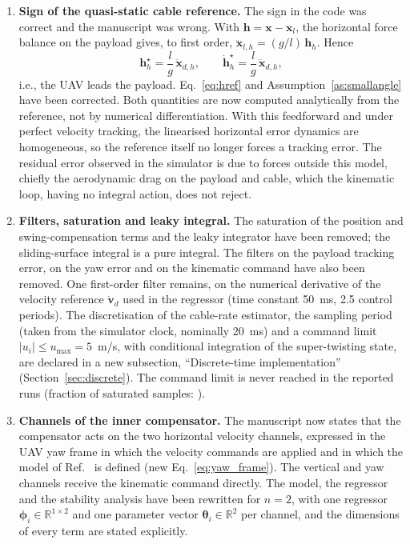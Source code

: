 \begin{reply}
\begin{enumerate}
\item \textbf{Sign of the quasi-static cable reference.} The sign in the code was correct and the manuscript was wrong. With $\mathbf{h}=\mathbf{x}-\mathbf{x}_l$, the horizontal force balance on the payload gives, to first order, $\ddot{\mathbf{x}}_{l,h}=(g/l)\,\mathbf{h}_h$. Hence
\begin{equation*}
\mathbf{h}_h^\star=\frac{l}{g}\,\ddot{\mathbf{x}}_{d,h},\qquad \dot{\mathbf{h}}_h^\star=\frac{l}{g}\,\dddot{\mathbf{x}}_{d,h},
\end{equation*}
i.e., the UAV leads the payload. Eq.~\eqref{eq:href} and Assumption~\ref{as:smallangle} have been corrected. Both quantities are now computed analytically from the reference, not by numerical differentiation. With this feedforward and under perfect velocity tracking, the linearised horizontal error dynamics are homogeneous, so the reference itself no longer forces a tracking error. The residual error observed in the simulator is due to forces outside this model, chiefly the aerodynamic drag on the payload and cable, which the kinematic loop, having no integral action, does not reject.

\item \textbf{Filters, saturation and leaky integral.} The saturation of the position and swing-compensation terms and the leaky integrator have been removed; the sliding-surface integral is a pure integral. The filters on the payload tracking error, on the yaw error and on the kinematic command have also been removed. One first-order filter remains, on the numerical derivative of the velocity reference $\dot{\mathbf{v}}_d$ used in the regressor (time constant 50~ms, 2.5 control periods). The discretisation of the cable-rate estimator, the sampling period (taken from the simulator clock, nominally 20~ms) and a command limit $|u_i|\le u_{\max}=5$~m/s, with conditional integration of the super-twisting state, are declared in a new subsection, ``Discrete-time implementation'' (Section~\ref{sec:discrete}). The command limit is never reached in the reported runs (fraction of saturated samples: \XX).

\item \textbf{Channels of the inner compensator.} The manuscript now states that the compensator acts on the two horizontal velocity channels, expressed in the UAV yaw frame in which the velocity commands are applied and in which the model of Ref.~\cite{Lucas_ICUAS2014} is defined (new Eq.~\eqref{eq:yaw_frame}). The vertical and yaw channels receive the kinematic command directly. The model, the regressor and the stability analysis have been rewritten for $n=2$, with one regressor $\boldsymbol{\phi}_i\in\mathbb{R}^{1\times2}$ and one parameter vector $\boldsymbol{\theta}_i\in\mathbb{R}^{2}$ per channel, and the dimensions of every term are stated explicitly.


\end{enumerate}
\end{reply}
